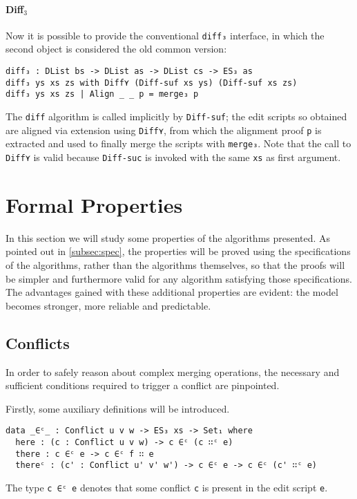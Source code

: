 \documentclass[../Thesis.tex]{subfiles}
\begin{document}
	\paragraph{Diff$_3$}
	Now it is possible to provide the conventional \texttt{diff₃} interface, in
	which the second object is considered the old common version:
\begin{verbatim}
diff₃ : DList bs -> DList as -> DList cs -> ES₃ as
diff₃ ys xs zs with Diff⋎ (Diff-suf xs ys) (Diff-suf xs zs)
diff₃ ys xs zs | Align _ _ p = merge₃ p
\end{verbatim}
	
	The \texttt{diff} algorithm is called implicitly by \texttt{Diff-suf}; the
	edit scripts so obtained are aligned via extension using 
	\texttt{Diff⋎}, from which the alignment proof \texttt{p} is extracted
	and used to finally merge the scripts with \texttt{merge₃}.
	Note that the call to \texttt{Diff⋎} is valid because \texttt{Diff-suc}
	is invoked with the same \texttt{xs} as first argument.
	
\section{Formal Properties}
\label{sec:FormalProp}
In this section we will study some properties of the algorithms presented. As pointed out in \ref{subsec:spec}, the 
properties will be proved using the specifications of the algorithms, rather
than the algorithms themselves, so that the proofs will be simpler and 
furthermore valid for any algorithm satisfying those specifications.
The advantages gained with these additional properties
are evident: the model becomes stronger, more reliable and predictable.

	\subsection{Conflicts}
	\label{subsec:conflicts}
		In order to safely reason about complex merging operations, 
		the necessary and sufficient conditions required to trigger a conflict are 
		pinpointed.

		Firstly, some auxiliary definitions will be introduced.
\begin{verbatim}
data _∈ᶜ_ : Conflict u v w -> ES₃ xs -> Set₁ where
  here : (c : Conflict u v w) -> c ∈ᶜ (c ∷ᶜ e)
  there : c ∈ᶜ e -> c ∈ᶜ f ∷ e
  thereᶜ : (c' : Conflict u' v' w') -> c ∈ᶜ e -> c ∈ᶜ (c' ∷ᶜ e)
\end{verbatim}

		The type \texttt{c ∈ᶜ e} denotes that some conflict \texttt{c}
		is present in the edit script \texttt{e}.
\end{document}
